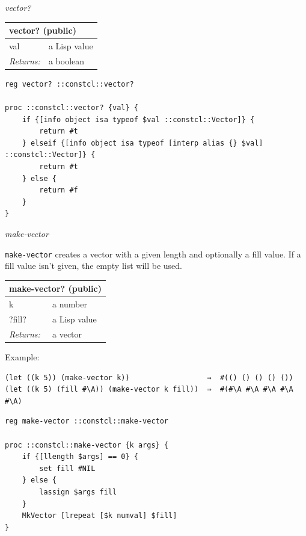 \documentclass[twoside,9pt]{report}
\begin{document}
\emph{vector?}

\begin{tabular}{ |l l| }
\hline
\multicolumn{2}{|l|}{vector? (public)} \\
\hline
val & a Lisp value \\
\textit{Returns:} & a boolean \\
\hline
\end{tabular}

\noindent\makebox[\linewidth]{\rule{\linewidth}{0.4pt}}
\begin{lstlisting}
reg vector? ::constcl::vector?
 
proc ::constcl::vector? {val} {
    if {[info object isa typeof $val ::constcl::Vector]} {
        return #t
    } elseif {[info object isa typeof [interp alias {} $val] ::constcl::Vector]} {
        return #t
    } else {
        return #f
    }
}
\end{lstlisting}
\noindent\makebox[\linewidth]{\rule{\linewidth}{0.4pt}}

\emph{make-vector}


\texttt{make-vector} creates a vector with a given length and optionally a fill value. If a fill value isn't given, the empty list will be used.

\begin{tabular}{ |l l| }
\hline
\multicolumn{2}{|l|}{make-vector? (public)} \\
\hline
k & a number \\
?fill? & a Lisp value \\
\textit{Returns:} & a vector \\
\hline
\end{tabular}


Example:

\noindent\makebox[\linewidth]{\rule{\linewidth}{0.4pt}}
\begin{lstlisting}
(let ((k 5)) (make-vector k))                  ⇒  #(() () () () ())
(let ((k 5) (fill #\A)) (make-vector k fill))  ⇒  #(#\A #\A #\A #\A #\A)
\end{lstlisting}
\noindent\makebox[\linewidth]{\rule{\linewidth}{0.4pt}}
\noindent\makebox[\linewidth]{\rule{\linewidth}{0.4pt}}
\begin{lstlisting}
reg make-vector ::constcl::make-vector
 
proc ::constcl::make-vector {k args} {
    if {[llength $args] == 0} {
        set fill #NIL
    } else {
        lassign $args fill
    }
    MkVector [lrepeat [$k numval] $fill]
}
\end{lstlisting}
\noindent\makebox[\linewidth]{\rule{\linewidth}{0.4pt}}
\end{document}
